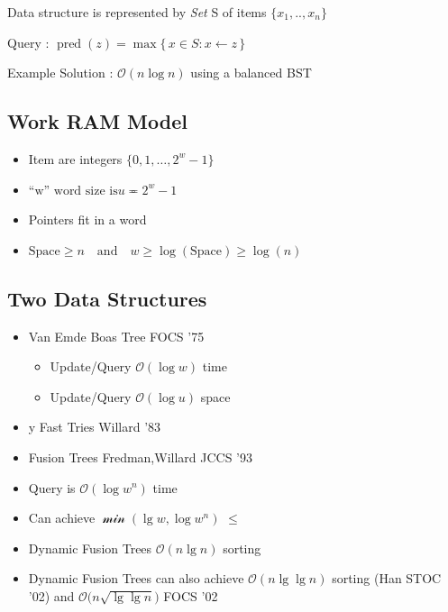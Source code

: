 \documentclass[../../../include/open-logic-chapter]{subfiles}
\begin{document}

Data structure is represented by \emph{Set} S of items $\{x_1,..,x_n\}$

Query : $\operatorname{pred}(z) = \max \{\, x \in S : x \leftarrow z \,\}$


Example Solution : $\mathcal{O}(n\log{}n)$ using a balanced BST



\subsection{Work RAM Model}

\begin{itemize}

\item {Item are integers $\{0,1,\dots,2^w-1 \}$}

\item $ \text{``w''  word  size is} u \eqcirc 2^w-1$

\item {Pointers fit in a word}

\item $ \text{Space} \ge n \quad\text{and}\quad w \ge \log(\text{Space}) \ge \log(n) $


\end{itemize}


\subsection{Two Data Structures}

\begin{itemize}

\item {Van Emde Boas Tree FOCS '75}
      \begin{itemize}
        \item{Update/Query $\mathcal{O}(\log{}w)$ time }
        \item{Update/Query $\mathcal{O}(\log{}u)$ space }
      \end{itemize}

\item {y Fast Tries Willard '83}

\end{itemize}

\begin{itemize}
\item {Fusion Trees Fredman,Willard JCCS '93}
\item{Query is $\mathcal{O}(\log{}w^{n})$ time }
\item{Can achieve $\mathcal\min(\lg w, \log{}w^{n})$ \(\le\) }
\item{Dynamic Fusion Trees  $\mathcal{O}(n\lg{}n)$ sorting  }
\item {Dynamic Fusion Trees can also achieve $\mathcal{O}(n\lg\lg n)$ sorting (Han STOC '02) and $\mathcal{O}\big(n\sqrt{\lg\lg n}\big)$ FOCS '02}

      \end{itemize}
\end{document}
